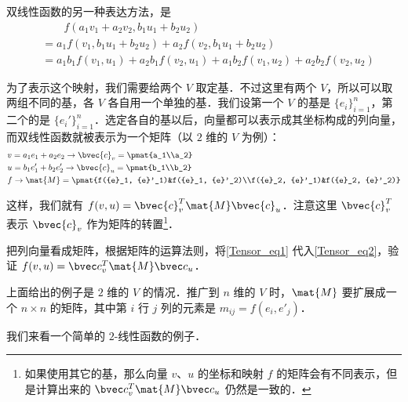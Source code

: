 双线性函数的另一种表达方法，是
\begin{equation}\label{Tensor_eq2}
\begin{aligned}
&\qquad f(a_1{v}_1+a_2{v}_2, b_1{u}_1+b_2{u}_2)\\
&=a_1f({v}_1, b_1{u}_1+b_2{u}_2)+a_2f({v}_2, b_1{u}_1+b_2{u}_2)\\
&=a_1b_1f({v}_1, {u}_1)+a_2b_1f({v}_2, {u}_1)+a_1b_2f({v}_1, {u}_2)+a_2b_2f({v}_2, {u}_2)
\end{aligned}
\end{equation}

为了表示这个映射，我们需要给两个 $V$ 取定基．不过这里有两个 $V$，所以可以取两组不同的基，各 $V$ 各自用一个单独的基．我们设第一个 $V$ 的基是 $\{{e}_i\}^n_{i=1}$，第二个的是 $\{{e}_i'\}^n_{i=1}$．选定各自的基以后，向量都可以表示成其坐标构成的列向量，而双线性函数就被表示为一个矩阵（以 $2$ 维的 $V$ 为例）：
\begin{equation}\label{Tensor_eq1}
\begin{aligned}
&{v}=a_1{e}_1+a_2{e}_2\rightarrow   \bvec{c}_v =\pmat{a_1\\a_2}\\
&{u}=b_1{e}'_1+b_2{e}'_2\rightarrow  \bvec{c}_u =\pmat{b_1\\b_2}\\
&f\rightarrow \mat{M}=\pmat{f({e}_1, {e}'_1)&f({e}_1, {e}'_2)\\f({e}_2, {e}'_1)&f({e}_2, {e}'_2)}\\
\end{aligned}
\end{equation}

这样，我们就有 $f({v}, {u})=  \bvec{c}_v^T \mat{M} \bvec{c}_u$．注意这里 $\bvec{c}_v^T$ 表示 $ \bvec{c}_v$ 作为矩阵的转置\footnote{如果使用其它的基，那么向量 ${v}$、${u}$ 的坐标和映射 $f$ 的矩阵会有不同表示，但是计算出来的 $ \bvec c_v^T\mat{M}  \bvec c_u$ 仍然是一致的．}．

\begin{exercise}{}
把列向量看成矩阵，根据矩阵的运算法则，将\autoref{Tensor_eq1} 代入\autoref{Tensor_eq2}，验证 $f({v}, {u})=  \bvec c_v^T\mat{M}  \bvec c_u$．
\end{exercise}

上面给出的例子是 $2$ 维的 $V$ 的情况．推广到 $n$ 维的 $V$ 时，$\mat{M}$ 要扩展成一个 $n\times n$ 的矩阵，其中第 $i$ 行 $j$ 列的元素是 $m_{ij}=f({e}_i, {e}'_j)$．

我们来看一个简单的 $2$-线性函数的例子．

